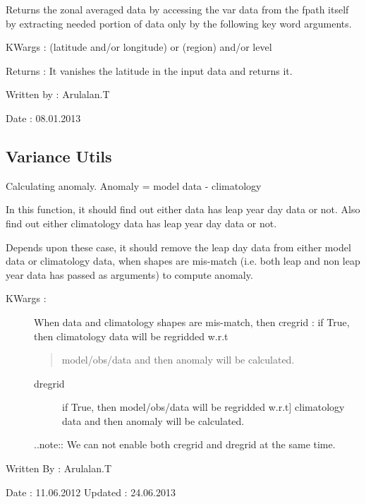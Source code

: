 \documentclass[letterpaper,10pt,english]{sphinxmanual}
\begin{document}

\begin{fulllineitems}
\label{mjo:psutils.zonalAvg}
Returns the zonal averaged data by accessing the var data from the fpath
itself by extracting needed portion of data only by the following
key word arguments.

KWargs : (latitude and/or longitude) or (region) and/or level

Returns : It vanishes the latitude in the input data and returns it.

Written by : Arulalan.T

Date : 08.01.2013

\end{fulllineitems}



\subsection{Variance Utils}
\label{mjo:variance-utils}\label{mjo:module-variance_utils}

\begin{fulllineitems}
\label{mjo:variance_utils.anomaly}
Calculating anomaly.
Anomaly = model data - climatology

In this function, it should find out either data has leap year day data
or not. Also find out either climatology data has leap year day data or
not.

Depends upon these case, it should remove the leap day data from either
model data or climatology data, when shapes are mis-match (i.e. both leap
and non leap year data has passed as arguments) to compute anomaly.
\begin{description}
\item[{KWargs :}] \leavevmode
When data and climatology shapes are mis-match, then
cregrid : if True, then climatology data will be regridded w.r.t
\begin{quote}

model/obs/data and then anomaly will be calculated.
\end{quote}
\begin{description}
\item[{dregrid}] \leavevmode{[}if True, then model/obs/data will be regridded w.r.t{]}
climatology data and then anomaly will be calculated.

\end{description}

..note:: We can not enable both cregrid and dregrid at the same time.

\end{description}

Written By : Arulalan.T

Date : 11.06.2012
Updated : 24.06.2013

\end{fulllineitems}
\end{document}
